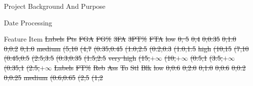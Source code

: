 \documentclass[
 size=14pt,
 paper=smartboard,  %
 mode=present, 		%
 display=slides, 	%
 style=tuliplab,  	%
 pauseslide,
 fleqn,leqno]{powerdot}
\providecommand{\DIFdeltex}[1]{{\protect\color{red}\sout{#1}}}                      %
\providecommand{\DIFdelFL}[1]{\DIFdel{#1}} %
\providecommand{\DIFdel}[1]{\texorpdfstring{\DIFdeltex{#1}}{}} %
\begin{document}
\begin{slide}
\begin{slide}{Project Background And Purpose}
\begin{slide}{Date Processing}
\begin{slide}{Feature Item}
\DIFdelFL{Labels }%
\DIFdelFL{Pts }%
\DIFdelFL{FGA }%
\DIFdelFL{FG\% }%
\DIFdelFL{3FA }%
\DIFdelFL{3PT\% }%
\DIFdelFL{FTA  }%
\DIFdelFL{low }%
\DIFdelFL{0, 5}%
\DIFdelFL{0,4}%
\DIFdelFL{0,0.35}%
\DIFdelFL{0,1.0}%
\DIFdelFL{0,0.2}%
\DIFdelFL{0,1.0}%
\DIFdelFL{medium}%
\DIFdelFL{(5,10}%
\DIFdelFL{(4,7}%
\DIFdelFL{(0.35,0.45}%
\DIFdelFL{(1.0,2.5}%
\DIFdelFL{(0.2,0.3}%
\DIFdelFL{(1.0,1.5}%
\DIFdelFL{high }%
\DIFdelFL{(10,15}%
\DIFdelFL{(7,10}%
\DIFdelFL{(0.45,0.5}%
\DIFdelFL{(2.5,3.5}%
\DIFdelFL{(0.3,0.35}%
\DIFdelFL{(1.5,2.5}%
\DIFdelFL{very high}%
\DIFdelFL{(15,$+\infty$}%
\DIFdelFL{(10,$+\infty$}%
\DIFdelFL{(0.5,1}%
\DIFdelFL{(3.5,$+\infty$}%
\DIFdelFL{(0.35,1}%
\DIFdelFL{(2.5,$+\infty$}%
\DIFdelFL{Labels }%
\DIFdelFL{FT\% }%
\DIFdelFL{Reb }%
\DIFdelFL{Ass }%
\DIFdelFL{To }%
\DIFdelFL{Stl }%
\DIFdelFL{Blk }%
\DIFdelFL{low   }%
\DIFdelFL{0,0.6}%
\DIFdelFL{0,2.0}%
\DIFdelFL{0,1.0}%
\DIFdelFL{0,0.6}%
\DIFdelFL{0,0.2}%
\DIFdelFL{0,0.25}%
\DIFdelFL{medium}%
\DIFdelFL{(0.6,0.65}%
\DIFdelFL{(2,5}%
\DIFdelFL{(1,2}%

\end{slide}
\end{slide}
\end{slide}
\end{slide}
\end{document}
